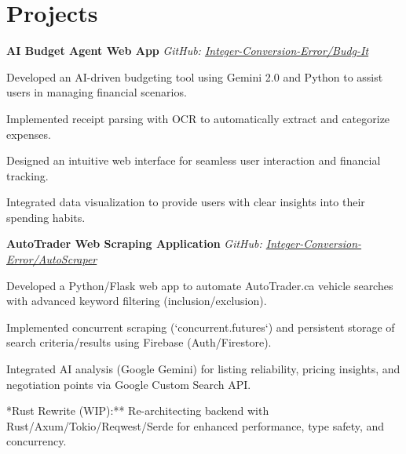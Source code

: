 \documentclass[11pt]{article}
\begin{document}
\section*{Projects}
\begin{small}


\noindent\textbf{AI Budget Agent Web App} \hfill \textit{GitHub: \href{https://github.com/Integer-Conversion-Error/Budg-It}{Integer-Conversion-Error/Budg-It}}
\begin{compactitem}
    \item Developed an AI-driven budgeting tool using Gemini 2.0 and Python to assist users in managing financial scenarios.
    \item Implemented receipt parsing with OCR to automatically extract and categorize expenses.
    \item Designed an intuitive web interface for seamless user interaction and financial tracking.
    \item Integrated data visualization to provide users with clear insights into their spending habits.
\end{compactitem}

\noindent\textbf{AutoTrader Web Scraping Application} \hfill \textit{GitHub: \href{https://github.com/Integer-Conversion-Error/AutoScraper}{Integer-Conversion-Error/AutoScraper}}
\begin{compactitem}
    \item Developed a Python/Flask web app to automate AutoTrader.ca vehicle searches with advanced keyword filtering (inclusion/exclusion).
    \item Implemented concurrent scraping (`concurrent.futures`) and persistent storage of search criteria/results using Firebase (Auth/Firestore).
    \item Integrated AI analysis (Google Gemini) for listing reliability, pricing insights, and negotiation points via Google Custom Search API.
    \item **Rust Rewrite (WIP):** Re-architecting backend with Rust/Axum/Tokio/Reqwest/Serde for enhanced performance, type safety, and concurrency.
\end{compactitem}


\end{small}
\end{document}
